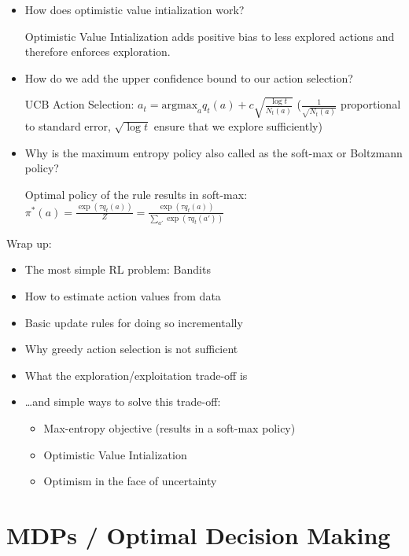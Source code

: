 \documentclass[11pt]{scrartcl}
\begin{document}
\begin{itemize}
    \item How does optimistic value intialization work?
    
    Optimistic Value Intialization adds positive bias to less explored actions and therefore enforces exploration.

    \item How do we add the upper confidence bound to our action selection?
    
    UCB Action Selection: $a_t = \mathrm{argmax}_a q_t(a) + c \sqrt{\frac{\log t}{N_t(a)}}$ ($\frac{1}{\sqrt{N_t(a)}}$ proportional to standard error, $\sqrt{\log t}$ ensure that we explore sufficiently)

    \item Why is the maximum entropy policy also called as the soft-max or Boltzmann policy?
    
    Optimal policy of the rule results in soft-max: $ \pi^*(a) = \frac{\exp(\tau q_t(a))}{Z} = \frac{\exp(\tau q_t(a))}{\sum_{a'} \exp(\tau q_t(a'))} $
\end{itemize}

Wrap up:

\begin{itemize}
    \item The most simple RL problem: Bandits
    \item How to estimate action values from data
    \item Basic update rules for doing so incrementally
    \item Why greedy action selection is not sufficient
    \item What the exploration/exploitation trade-off is
    \item \dots and simple ways to solve this trade-off:
    \begin{itemize}
        \item Max-entropy objective (results in a soft-max policy)
        \item Optimistic Value Intialization
        \item Optimism in the face of uncertainty
    \end{itemize}
\end{itemize}


\section{MDPs / Optimal Decision Making}
\end{document}
